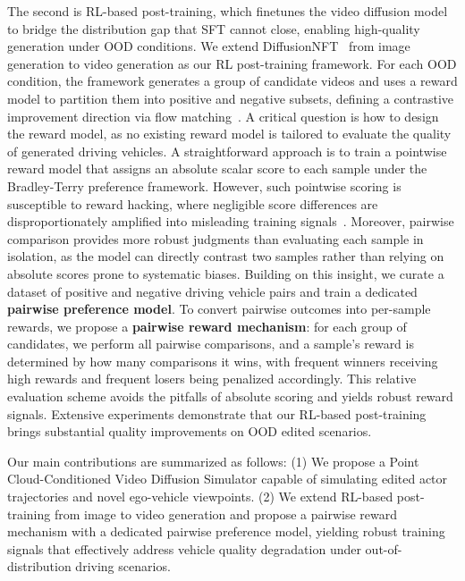 \documentclass[runningheads]{llncs}
\begin{document}
The second is RL-based post-training, which finetunes the video diffusion model to bridge the distribution gap that SFT cannot close, enabling high-quality generation under OOD conditions. We extend DiffusionNFT~\cite{zheng2025diffusionnft} from image generation to video generation as our RL post-training framework. For each OOD condition, the framework generates a group of candidate videos and uses a reward model to partition them into positive and negative subsets, defining a contrastive improvement direction via flow matching~\cite{lipman2022flow}. A critical question is how to design the reward model, as no existing reward model is tailored to evaluate the quality of generated driving vehicles. A straightforward approach is to train a pointwise reward model that assigns an absolute scalar score to each sample under the Bradley-Terry preference framework. However, such pointwise scoring is susceptible to reward hacking, where negligible score differences are disproportionately amplified into misleading training signals~\cite{Pref-GRPO&UniGenBench}. Moreover, pairwise comparison provides more robust judgments than evaluating each sample in isolation, as the model can directly contrast two samples rather than relying on absolute scores prone to systematic biases. Building on this insight, we curate a dataset of positive and negative driving vehicle pairs and train a dedicated \textbf{pairwise preference model}. To convert pairwise outcomes into per-sample rewards, we propose a \textbf{pairwise reward mechanism}: for each group of candidates, we perform all pairwise comparisons, and a sample's reward is determined by how many comparisons it wins, with frequent winners receiving high rewards and frequent losers being penalized accordingly. This relative evaluation scheme avoids the pitfalls of absolute scoring and yields robust reward signals. Extensive experiments demonstrate that our RL-based post-training brings substantial quality improvements on OOD edited scenarios.


Our main contributions are summarized as follows: (1) We propose a Point Cloud-Conditioned Video Diffusion Simulator capable of simulating edited actor trajectories and novel ego-vehicle viewpoints. (2) We extend RL-based post-training from image to video generation and propose a pairwise reward mechanism with a dedicated pairwise preference model, yielding robust training signals that effectively address vehicle quality degradation under out-of-distribution driving scenarios.
\end{document}
